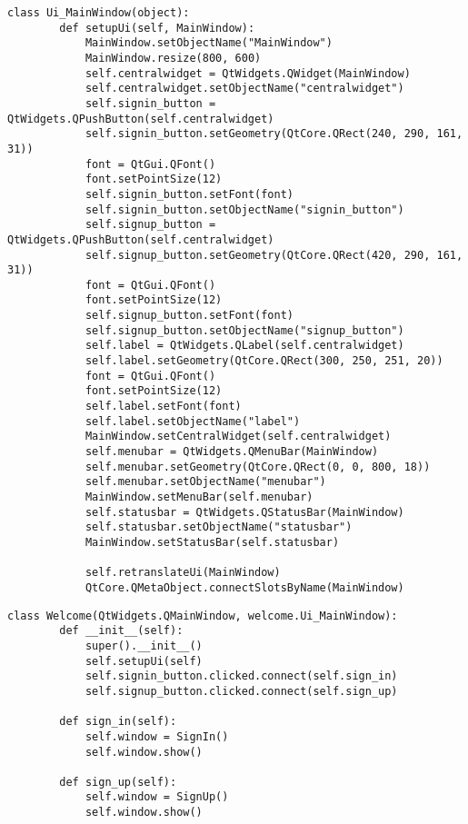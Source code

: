 \label{app:signin}

\begin{lstlisting}[caption={реализация GUI окна входа/регистрации}]
	class Ui_MainWindow(object):
		def setupUi(self, MainWindow):
			MainWindow.setObjectName("MainWindow")
			MainWindow.resize(800, 600)
			self.centralwidget = QtWidgets.QWidget(MainWindow)
			self.centralwidget.setObjectName("centralwidget")
			self.signin_button = QtWidgets.QPushButton(self.centralwidget)
			self.signin_button.setGeometry(QtCore.QRect(240, 290, 161, 31))
			font = QtGui.QFont()
			font.setPointSize(12)
			self.signin_button.setFont(font)
			self.signin_button.setObjectName("signin_button")
			self.signup_button = QtWidgets.QPushButton(self.centralwidget)
			self.signup_button.setGeometry(QtCore.QRect(420, 290, 161, 31))
			font = QtGui.QFont()
			font.setPointSize(12)
			self.signup_button.setFont(font)
			self.signup_button.setObjectName("signup_button")
			self.label = QtWidgets.QLabel(self.centralwidget)
			self.label.setGeometry(QtCore.QRect(300, 250, 251, 20))
			font = QtGui.QFont()
			font.setPointSize(12)
			self.label.setFont(font)
			self.label.setObjectName("label")
			MainWindow.setCentralWidget(self.centralwidget)
			self.menubar = QtWidgets.QMenuBar(MainWindow)
			self.menubar.setGeometry(QtCore.QRect(0, 0, 800, 18))
			self.menubar.setObjectName("menubar")
			MainWindow.setMenuBar(self.menubar)
			self.statusbar = QtWidgets.QStatusBar(MainWindow)
			self.statusbar.setObjectName("statusbar")
			MainWindow.setStatusBar(self.statusbar)
			
			self.retranslateUi(MainWindow)
			QtCore.QMetaObject.connectSlotsByName(MainWindow)
\end{lstlisting}

\clearpage

 \label{app:controller}

\begin{lstlisting}[caption={контроллер окна входа/регистрации}]
	class Welcome(QtWidgets.QMainWindow, welcome.Ui_MainWindow):
		def __init__(self):
			super().__init__()
			self.setupUi(self)
			self.signin_button.clicked.connect(self.sign_in)
			self.signup_button.clicked.connect(self.sign_up)
	
		def sign_in(self):
			self.window = SignIn()
			self.window.show()
	
		def sign_up(self):
			self.window = SignUp()
			self.window.show()
\end{lstlisting}


